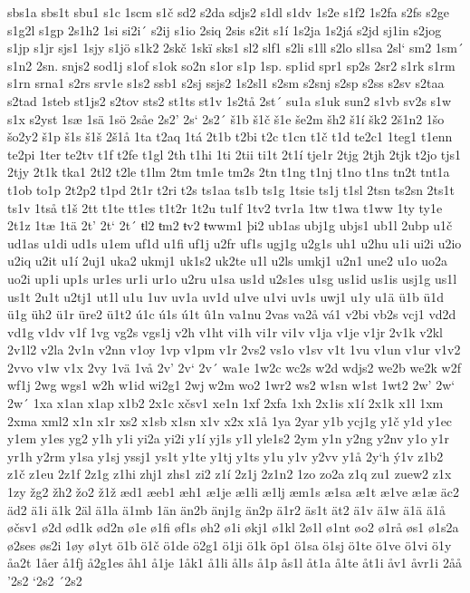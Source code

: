 sbs1a
sbs1t
sbu1
s1c
1scm
s1č
sd2
s2da
sdjs2
s1dl
s1dv
1s2e
s1f2
1s2fa
s2fs
s2ge
s1g2l
s1gp
2s1h2
1si
si2i´
s2ij
s1io
2siq
2sis
s2it
s1í
1s2ja
1s2já
s2jd
sj1in
s2jog
s1jp
s1jr
sjs1
1sjy
s1jö
s1k2
2skč
1skï
sks1
sl2
slf1
s2li
s1ll
s2lo
sl1sa
2sl`
sm2
1sm´
s1n2
2sn.
snjs2
sod1j
s1of
s1ok
so2n
s1or
s1p
1sp.
sp1id
spr1
sp2s
2sr2
s1rk
s1rm
s1rn
srna1
s2rs
srv1e
s1s2
ssb1
s2sj
ssjs2
1s2sl1
s2sm
s2snj
s2sp
s2ss
s2sv
s2taa
s2tad
1steb
st1js2
s2tov
sts2
st1ts
st1v
1s2tå
2st´
su1a
s1uk
sun2
s1vb
sv2s
s1w
s1x
s2yst
1sæ
1sä
1sö
2såe
2s2'
2s`
2s2´
š1b
š1č
š1e
še2m
šh2
š1í
šk2
2š1n2
1šo
šo2y2
š1p
š1s
š1š
2š1å
1ta
t2aq
1tá
2t1b
t2bi
t2c
t1cn
t1č
t1d
te2c1
1teg1
t1enn
te2pi
1ter
te2tv
t1f
t2fe
t1gl
2th
t1hi
1ti
2tii
ti1t
2t1í
tje1r
2tjg
2tjh
2tjk
t2jo
tjs1
2tjy
2t1k
tka1
2tl2
t2le
t1lm
2tm
tm1e
tm2s
2tn
t1ng
t1nj
t1no
t1ns
tn2t
tnt1a
t1ob
to1p
2t2p2
t1pd
2t1r
t2ri
t2s
ts1aa
ts1b
ts1g
1tsie
ts1j
t1sl
2tsn
ts2sn
2ts1t
ts1v
1tså
t1š
2tt
t1te
tt1es
t1t2r
1t2u
tu1f
1tv2
tvr1a
1tw
t1wa
t1ww
1ty
ty1e
2t1z
1tæ
1tä
2t'
2t`
2t´
ŧl2
ŧm2
ŧv2
ŧwwm1
þi2
ub1as
ubj1g
ubjs1
ub1l
2ubp
u1č
ud1as
u1di
ud1s
u1em
uf1d
u1fi
uf1j
u2fr
uf1s
ugj1g
u2g1s
uh1
u2hu
u1i
ui2i
u2io
u2iq
u2it
u1í
2uj1
uka2
ukmj1
uk1s2
uk2te
u1l
u2ls
umkj1
u2n1
une2
u1o
uo2a
uo2i
up1i
up1s
ur1es
ur1i
ur1o
u2ru
u1sa
us1d
u2s1es
u1sg
us1id
us1is
usj1g
us1l
us1t
2u1t
u2tj1
ut1l
u1u
1uv
uv1a
uv1d
u1ve
u1vi
uv1s
uwj1
u1y
u1ä
ü1b
ü1d
ü1g
üh2
ü1r
üre2
ü1t2
ú1c
ú1s
ú1t
û1n
va1nu
2vas
va2å
vá1
v2bi
vb2s
vcj1
vd2d
vd1g
v1dv
v1f
1vg
vg2s
vgs1j
v2h
v1ht
vi1h
vi1r
vi1v
v1ja
v1je
v1jr
2v1k
v2kl
2v1l2
v2la
2v1n
v2nn
v1oy
1vp
v1pm
v1r
2vs2
vs1o
v1sv
v1t
1vu
v1un
v1ur
v1v2
2vvo
v1w
v1x
2vy
1vä
1vå
2v'
2v`
2v´
wa1e
1w2c
wc2s
w2d
wdjs2
we2b
we2k
w2f
wf1j
2wg
wgs1
w2h
w1id
wi2g1
2wj
w2m
wo2
1wr2
ws2
w1sn
w1st
1wt2
2w'
2w`
2w´
1xa
x1an
x1ap
x1b2
2x1c
xčsv1
xe1n
1xf
2xfa
1xh
2x1is
x1í
2x1k
x1l
1xm
2xma
xml2
x1n
x1r
xs2
x1sb
x1sn
x1v
x2x
x1å
1ya
2yar
y1b
ycj1g
y1č
y1d
y1ec
y1em
y1es
yg2
y1h
y1i
yi2a
yi2i
y1í
yj1s
y1l
yle1s2
2ym
y1n
y2ng
y2nv
y1o
y1r
yr1h
y2rm
y1sa
y1sj
yssj1
ys1t
y1te
y1tj
y1ts
y1u
y1v
y2vv
y1å
2y`h
ý1v
z1b2
z1č
z1eu
2z1f
2z1g
z1hi
zhj1
zhs1
zi2
z1í
2z1j
2z1n2
1zo
zo2a
z1q
zu1
zuew2
z1x
1zy
žg2
žh2
žo2
ž1ž
æd1
æeb1
æh1
æ1je
æ1li
æ1lj
æm1s
æ1sa
æ1t
æ1ve
æ1æ
äc2
äd2
ä1i
ä1k
2äl
ä1la
ä1mb
1än
än2b
änj1g
än2p
ä1r2
äs1t
ät2
ä1v
ä1w
ä1ä
ä1å
øčsv1
ø2d
ød1k
ød2n
ø1e
ø1fi
øf1s
øh2
ø1i
økj1
ø1kl
2ø1l
ø1nt
øo2
ø1rå
øs1
ø1s2a
ø2ses
øs2i
1øy
ø1yt
ö1b
ö1č
ö1de
ö2g1
ö1ji
ö1k
öp1
ö1sa
ö1sj
ö1te
ö1ve
ö1vi
ö1y
åa2t
1åer
å1fj
å2g1es
åh1
å1je
1åk1
å1li
ål1s
å1p
ås1l
åt1a
å1te
åt1i
åv1
åvr1i
2åå
'2s2
`2s2
´2s2
